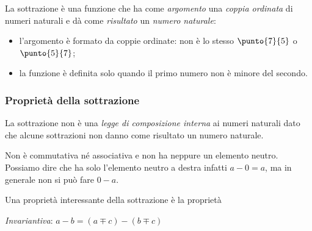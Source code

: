 La sottrazione è una funzione che ha come \emph{argomento} una \emph{coppia 
ordinata} di numeri naturali e dà come \emph{risultato} un \emph{numero 
naturale}:

\vspace{1em}
\begin{minipage}[t]{.48\textwidth}
\begin{center}
\begin{inaccessibleblock}
\end{inaccessibleblock}
\end{center}
\end{minipage}
\hfill
\begin{minipage}[t]{.48\textwidth}
\begin{center}
\begin{inaccessibleblock}
\end{inaccessibleblock}
\end{center}
\end{minipage}

\vspace{-1em}
\begin{osservazione}
\begin{itemize} [nosep]
\item l'argomento è formato da coppie ordinate: non è lo stesso 
\(\punto{7}{5}\) o \(\punto{5}{7}\);
\item la funzione è definita solo quando il primo numero non è 
minore del secondo.
\end{itemize}

\end{osservazione}

\subsubsection{Proprietà della sottrazione}

La sottrazione non è una \emph{legge di composizione interna} ai numeri 
naturali dato che alcune sottrazioni non danno come risultato un numero
naturale.

Non è commutativa né associativa e non ha neppure un elemento neutro.
Possiamo dire che ha solo l'elemento neutro a destra infatti \(a - 0 = a\), 
ma in generale non si può fare \(0 - a\).

Una proprietà interessante della sottrazione è la proprietà 
\begin{itemize*}
 \item \emph{Invariantiva}: \(a - b = (a \mp c) - (b \mp c)\)
\end{itemize*}

